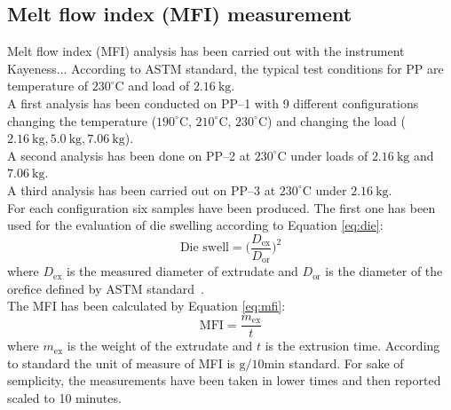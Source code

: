 \documentclass[a4paper, 11pt]{article}
\begin{document}
\subsection{Melt flow index (MFI) measurement}

Melt flow index (MFI) analysis has been carried out with the instrument Kayeness... According to ASTM standard, the typical test conditions for PP are temperature of $230 ^\circ$C and load of $2.16\  \text{kg}$. \\
A first analysis has been conducted on PP–1 with 9 different configurations changing the temperature ($190 ^\circ$C, $210 ^\circ$C, $230 ^\circ$C) and changing the load ($2.16\ \text{kg}, 5.0\ \text{kg}, 7.06 \ \text{kg}$). \\
A second analysis has been done on PP–2 at $230 ^\circ$C under loads of  $2.16\ \text{kg}$ and  $7.06\ \text{kg}$. \\
A third analysis has been carried out on PP–3 at $230 ^\circ$C under $2.16\ \text{kg}$. \\
For each configuration six samples have been produced. The first one has been used for the evaluation of die swelling according to Equation \ref{eq:die}:
\begin{equation}
\text{Die\ swell} = \bigg(\frac{D_\text{ex}}{D_\text{or}}\bigg)^2
\label{eq:die}
\end{equation}
where $D_\text{ex}$ is the measured diameter of extrudate and $D_\text{or}$ is the diameter of the orefice defined by ASTM standard~\cite{MFI}. \\
The MFI has been calculated by Equation \ref{eq:mfi}: 
\begin{equation}
\text{MFI} = \frac{m_\text{ex}}{t}
\label{eq:mfi}
\end{equation}
where $m_\text{ex}$ is the weight of the extrudate and $t$ is the extrusion time. According to standard the unit of measure of MFI is $\text{g/10min}$ standard. For sake of semplicity, the measurements have been taken in lower times and then reported scaled to 10 minutes. 
\end{document}
